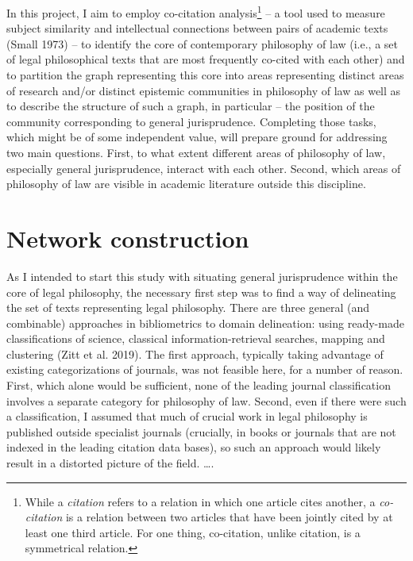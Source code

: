 \documentclass[
]{article}
\begin{document}
In this project, I aim to employ co-citation analysis\footnote{While a \emph{citation} refers to a relation in which one article cites another, a \emph{co-citation} is a relation between two articles that have been jointly cited by at least one third article. For one thing, co-citation, unlike citation, is a symmetrical relation.} -- a tool used to measure subject similarity and intellectual connections between pairs of academic texts (Small 1973) -- to identify the core of contemporary philosophy of law (i.e., a set of legal philosophical texts that are most frequently co-cited with each other) and to partition the graph representing this core into areas representing distinct areas of research and/or distinct epistemic communities in philosophy of law as well as to describe the structure of such a graph, in particular -- the position of the community corresponding to general jurisprudence. Completing those tasks, which might be of some independent value, will prepare ground for addressing two main questions. First, to what extent different areas of philosophy of law, especially general jurisprudence, interact with each other. Second, which areas of philosophy of law are visible in academic literature outside this discipline.

\hypertarget{network-construction}{%
\section{Network construction}\label{network-construction}}

As I intended to start this study with situating general jurisprudence within the core of legal philosophy, the necessary first step was to find a way of delineating the set of texts representing legal philosophy. There are three general (and combinable) approaches in bibliometrics to domain delineation: using ready-made classifications of science, classical information-retrieval searches, mapping and clustering (Zitt et al. 2019). The first approach, typically taking advantage of existing categorizations of journals, was not feasible here, for a number of reason. First, which alone would be sufficient, none of the leading journal classification involves a separate category for philosophy of law. Second, even if there were such a classification, I assumed that much of crucial work in legal philosophy is published outside specialist journals (crucially, in books or journals that are not indexed in the leading citation data bases), so such an approach would likely result in a distorted picture of the field. \ldots.
\end{document}
